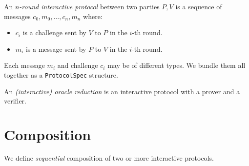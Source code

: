 \begin{definition}
    \label{def:interactive_protocol}
    An \emph{$n$-round interactive protocol} between two parties $P, V$ is a sequence of messages $c_0, m_0, \dots, c_n, m_n$ where:
    \begin{itemize}
        \item $c_i$ is a challenge sent by $V$ to $P$ in the $i$-th round.
        \item $m_i$ is a message sent by $P$ to $V$ in the $i$-th round.
    \end{itemize}
    Each message $m_i$ and challenge $c_i$ may be of different types. We bundle them all together as a \verb|ProtocolSpec| structure.
\end{definition}

\begin{definition}\label{def:interactive_oracle_protocol}
    An \emph{(interactive) oracle reduction} is an interactive protocol with a prover and a verifier.
\end{definition}

\begin{definition}[Completeness]
    \label{def:completeness}
\end{definition}

\begin{definition}[Soundness]
    \label{def:soundness}
\end{definition}

\section{Composition}

We define \emph{sequential} composition of two or more interactive protocols.

\begin{definition}
    \label{def:protocol_spec_composition}
\end{definition}

\begin{definition}
    \label{def:prover_composition}
\end{definition}

\begin{definition}
    \label{def:verifier_composition}
\end{definition}

